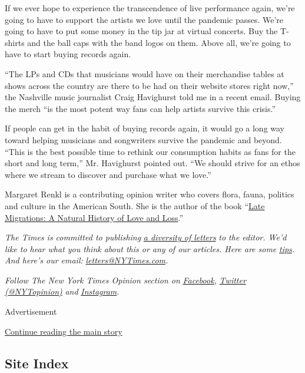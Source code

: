 If we ever hope to experience the transcendence of live performance
again, we're going to have to support the artists we love until the
pandemic passes. We're going to have to put some money in the tip jar at
virtual concerts. Buy the T-shirts and the ball caps with the band logos
on them. Above all, we're going to have to start buying records again.

``The LPs and CDs that musicians would have on their merchandise tables
at shows across the country are there to be had on their website stores
right now,'' the Nashville music journalist Craig Havighurst told me in
a recent email. Buying the merch ``is the most potent way fans can help
artists survive this crisis.''

If people can get in the habit of buying records again, it would go a
long way toward helping musicians and songwriters survive the pandemic
and beyond. ``This is the best possible time to rethink our consumption
habits as fans for the short and long term,'' Mr. Havighurst pointed
out. ``We should strive for an ethos where we stream to discover and
purchase what we love.''

Margaret Renkl is a contributing opinion writer who covers flora, fauna,
politics and culture in the American South. She is the author of the
book ``\href{https://milkweed.org/book/late-migrations}{Late Migrations:
A Natural History of Love and Loss}.''

\emph{The Times is committed to publishing}
\href{https://www.nytimes3xbfgragh.onion/2019/01/31/opinion/letters/letters-to-editor-new-york-times-women.html}{\emph{a
diversity of letters}} \emph{to the editor. We'd like to hear what you
think about this or any of our articles. Here are some}
\href{https://help.nytimes3xbfgragh.onion/hc/en-us/articles/115014925288-How-to-submit-a-letter-to-the-editor}{\emph{tips}}\emph{.
And here's our email:}
\href{mailto:letters@NYTimes.com}{\emph{letters@NYTimes.com}}\emph{.}

\emph{Follow The New York Times Opinion section on}
\href{https://www.facebookcorewwwi.onion/nytopinion}{\emph{Facebook}}\emph{,}
\href{http://twitter.com/NYTOpinion}{\emph{Twitter (@NYTopinion)}}
\emph{and}
\href{https://www.instagram.com/nytopinion/}{\emph{Instagram}}\emph{.}

Advertisement

\protect\hyperlink{after-bottom}{Continue reading the main story}

\hypertarget{site-index}{%
\subsection{Site Index}\label{site-index}}

